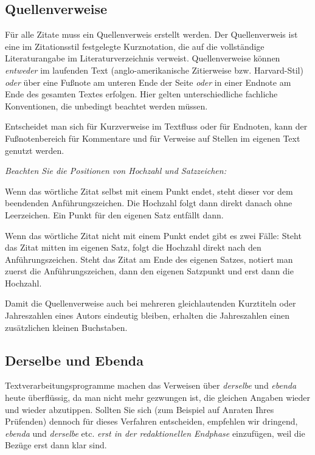\subsection{Quellenverweise}
Für alle Zitate muss ein Quellenverweis erstellt werden. Der Quellenverweis ist eine im Zitationsstil festgelegte Kurznotation, die auf die vollständige Literaturangabe im Literaturverzeichnis verweist. Quellenverweise können \emph{entweder} im laufenden Text (anglo-amerikanische Zitierweise bzw. Harvard-Stil) \emph{oder} über eine Fußnote am unteren Ende der Seite \emph{oder} in einer Endnote am Ende des gesamten Textes erfolgen. Hier gelten unterschiedliche fachliche Konventionen, die unbedingt beachtet werden müssen.
\par
Entscheidet man sich für Kurzverweise im Textfluss oder für Endnoten, kann der Fußnotenbereich für Kommentare und für Verweise auf Stellen im eigenen Text genutzt werden.
\par
\emph{Beachten Sie die Positionen von Hochzahl und Satzzeichen:}
\par
Wenn das wörtliche Zitat selbst mit einem Punkt endet, steht dieser vor dem beendenden Anführungszeichen. Die Hochzahl folgt dann direkt danach ohne Leerzeichen. Ein Punkt für den eigenen Satz entfällt dann.
\par
Wenn das wörtliche Zitat nicht mit einem Punkt endet gibt es zwei Fälle: Steht das Zitat mitten im eigenen Satz, folgt die Hochzahl direkt nach den Anführungszeichen. Steht das Zitat am Ende des eigenen Satzes, notiert man zuerst die Anführungszeichen, dann den eigenen Satzpunkt und erst dann die Hochzahl.
\par
Damit die Quellenverweise auch bei mehreren gleichlautenden Kurztiteln oder Jahreszahlen eines Autors eindeutig bleiben, erhalten die Jahreszahlen einen zusätzlichen kleinen Buchstaben.
%
\subsection{Derselbe und Ebenda}
Textverarbeitungsprogramme machen das Verweisen über \emph{derselbe} und \emph{ebenda} heute überflüssig, da man nicht mehr gezwungen ist, die gleichen Angaben wieder und wieder abzutippen. Sollten Sie sich (zum Beispiel auf Anraten Ihres Prüfenden) dennoch für dieses Verfahren entscheiden, empfehlen wir dringend, \emph{ebenda} und \emph{derselbe} etc. \emph{erst in der redaktionellen Endphase} einzufügen, weil die Bezüge erst dann klar sind.
%
